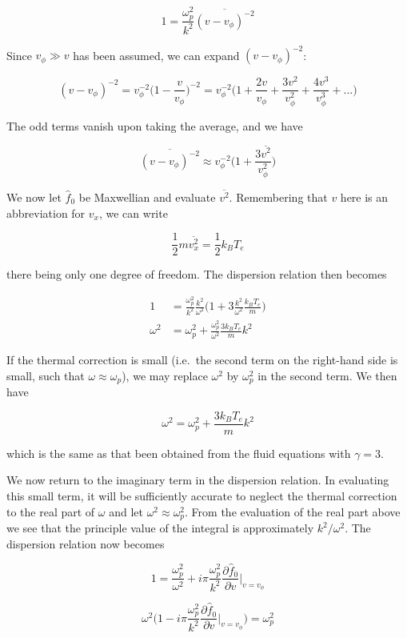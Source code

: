 \documentclass[
  notoc %
]{tufte-book}
\begin{document}
\[
1 = \frac{\omega_p^2}{k^2} \overline{(v-v_\phi)^{-2}}
\]

Since \(v_\phi \gg v\) has been assumed, we can expand
\((v-v_\phi)^{-2}\):

\[
(v-v_\phi)^{-2} = v_\phi^{-2}\Big( 1 - \frac{v}{v_\phi} \Big)^{-2} = v_\phi^{-2}\Big( 1 + \frac{2v}{v_\phi} + \frac{3v^2}{v_\phi^2} + \frac{4v^3}{v_\phi^3} + ... \Big)
\]

The odd terms vanish upon taking the average, and we have

\[
\overline{(v-v_\phi)^{-2}} \approx v_\phi^{-2} \Big( 1 + \frac{3\overline{v^2}}{v_\phi^2} \Big)
\]

We now let \(\hat{f}_0\) be Maxwellian and evaluate \(\overline{v^2}\).
Remembering that \(v\) here is an abbreviation for \(v_x\), we can write

\[
\frac{1}{2}m\overline{v_x^2} = \frac{1}{2}k_B T_e
\]

there being only one degree of freedom. The dispersion relation then
becomes

\[
\begin{aligned}
1 &= \frac{\omega_p^2}{k^2}\frac{k^2}{\omega^2}\Big( 1+ 3\frac{k^2}{\omega^2}\frac{k_B T_e}{m} \Big) \\
\omega^2 &= \omega_p^2 + \frac{\omega_p^2}{\omega^2}\frac{3k_B T_e}{m}k^2
\end{aligned}
\]

If the thermal correction is small (i.e.~the second term on the
right-hand side is small, such that \(\omega \approx \omega_p\)), we may
replace \(\omega^2\) by \(\omega_p^2\) in the second term. We then have

\[
\omega^2 = \omega_p^2 + \frac{3k_B T_e}{m}k^2
\]

which is the same as that been obtained from the fluid equations with
\(\gamma=3\).

We now return to the imaginary term in the dispersion relation. In
evaluating this small term, it will be sufficiently accurate to neglect
the thermal correction to the real part of \(\omega\) and let
\(\omega^2\approx \omega_p^2\). From the evaluation of the real part
above we see that the principle value of the integral is approximately
\(k^2/\omega^2\). The dispersion relation now becomes

\[
1 = \frac{\omega_p^2}{\omega^2} + i\pi\frac{\omega_p^2}{k^2}\frac{\partial\hat{f}_0}{\partial v}\biggr\rvert_{v=v_\phi}
\]

\[
\omega^2 \Big( 1 - i\pi\frac{\omega_p^2}{k^2}\frac{\partial\hat{f}_0}{\partial v}\biggr\rvert_{v=v_\phi} \Big) = \omega_p^2
\]
\end{document}
